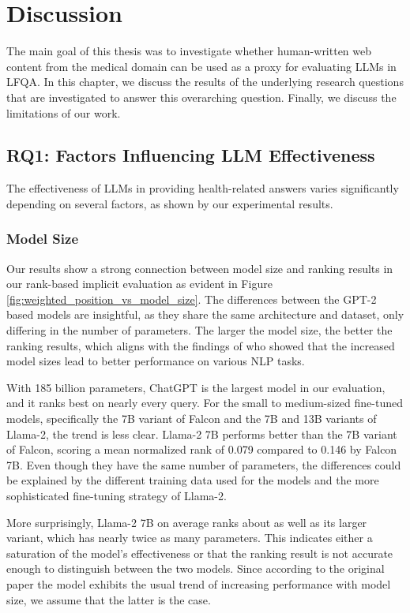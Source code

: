
\chapter{Discussion}\label{discussion}

The main goal of this thesis was to investigate whether human-written web content from the medical domain can be used as a proxy for evaluating LLMs in LFQA.
In this chapter, we discuss the results of the underlying research questions that are investigated to answer this overarching question.
Finally, we discuss the limitations of our work.

\section{RQ1: Factors Influencing LLM Effectiveness}

The effectiveness of LLMs in providing health-related answers varies significantly depending on several factors, as shown by our experimental results.

\subsection{Model Size}
Our results show a strong connection between model size and ranking results in our rank-based implicit evaluation as evident in Figure \ref{fig:weighted_position_vs_model_size}. 
The differences between the GPT-2 based models are insightful, as they share the same architecture and dataset, only differing in the number of parameters.
The larger the model size, the better the ranking results, which aligns with the findings of \cite{radford:2019:language} who showed that the increased model sizes lead to better performance on various NLP tasks.

With 185 billion parameters, ChatGPT is the largest model in our evaluation, and it ranks best on nearly every query.
For the small to medium-sized fine-tuned models, specifically the 7B variant of Falcon and the 7B and 13B variants of Llama-2, the trend is less clear.
Llama-2 7B performs better than the 7B variant of Falcon, scoring a mean normalized rank of 0.079 compared to 0.146 by Falcon 7B.
Even though they have the same number of parameters, the differences could be explained by the different training data used for the models and the more sophisticated fine-tuning strategy of Llama-2.

More surprisingly, Llama-2 7B on average ranks about as well as its larger variant, which has nearly twice as many parameters.
This indicates either a saturation of the model's effectiveness or that the ranking result is not accurate enough to distinguish between the two models.
Since according to the original paper \cite{touvron:2023:Llama} the model exhibits the usual trend of increasing performance with model size, we assume that the latter is the case.

